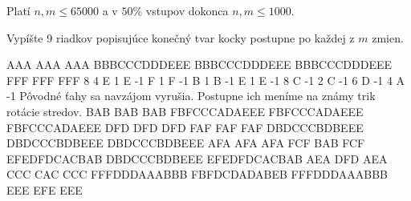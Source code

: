 \smallskip

Platí $n,m \leq 65000$
a v $50\%$ vstupov dokonca
$n,m \leq 1000$.


Vypíšte 9 riadkov popisujúce konečný tvar kocky
postupne po každej z $m$ zmien.


\sampleIN
AAA
AAA
AAA
BBBCCCDDDEEE
BBBCCCDDDEEE
BBBCCCDDDEEE
FFF
FFF
FFF
8 4
E 1
E -1
F 1
F -1
B 1
B -1
E 1
E -1
8 C -1
2 C -1
6 D -1
4 A -1
\sampleCOMMENT
Pôvodné ťahy sa navzájom vyrušia.
Postupne ich meníme na známy trik
rotácie stredov.
\sampleOUT
BAB
BAB
BAB
FBFCCCADAEEE
FBFCCCADAEEE
FBFCCCADAEEE
DFD
DFD
DFD
FAF
FAF
FAF
DBDCCCBDBEEE
DBDCCCBDBEEE
DBDCCCBDBEEE
AFA
AFA
AFA
FCF
BAB
FCF
EFEDFDCACBAB
DBDCCCBDBEEE
EFEDFDCACBAB
AEA
DFD
AEA
CCC
CAC
CCC
FFFDDDAAABBB
FBFDCDADABEB
FFFDDDAAABBB
EEE
EFE
EEE
\sampleEND


